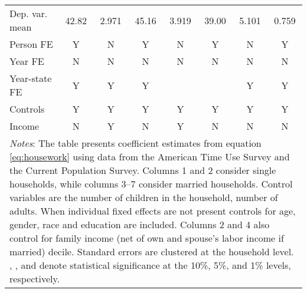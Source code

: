 {\begin{tabular}{l*{7}{c}}
Dep. var. mean      &       42.82         &       2.971         &       45.16         &       3.919         &       39.00         &       5.101         &       0.759         \\
Person FE           &           Y         &           N         &           Y         &           N         &           Y         &           N         &           Y         \\
Year FE             &           N         &           N         &           N         &           N         &           N         &           N         &           N         \\
Year-state FE       &           Y         &           Y         &           Y         &                     &                     &           Y         &           Y         \\
Controls            &           Y         &           Y         &           Y         &           Y         &           Y         &           Y         &           Y         \\
Income              &           N         &           Y         &           N         &           Y         &           N         &           N         &           N         \\
\bottomrule
\multicolumn{8}{p{17cm}}{\footnotesize \textit{Notes}: The table presents coefficient estimates from equation \ref{eq:housework} using data from the American Time Use Survey and the Current Population Survey. Columns 1 and 2 consider single households, while columns 3--7 consider married households. Control variables are the number of children in the household, number of adults. When individual fixed effects are not present controls for age, gender, race and education are included. Columns 2 and 4 also control for family income (net of own and spouse's labor income if married) decile. Standard errors are clustered at the household level. \sym{*}, \sym{**}, and \sym{***} denote statistical significance at the 10\%, 5\%, and 1\% levels, respectively.}\\
\end{tabular}
}
